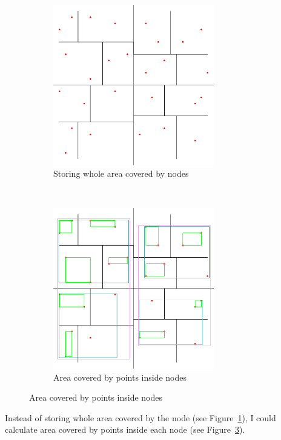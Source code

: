 \documentclass[10pt,a4paper]{article}
\begin{document}
\begin{figure}[h!]
        \centering
        \begin{subfigure}[b]{0.42\textwidth}
                \centering
                \includegraphics[width=7cm]{Figure1}
        	\caption{Storing whole area covered by nodes}
  				\label{fig:covered}
        \end{subfigure}%
        \qquad\qquad
        ~ %
        \begin{subfigure}[b]{0.42\textwidth}
                \centering
 				\includegraphics[width=7cm]{Figure2}
 				 \caption{Area covered by points inside nodes}
 				 \label{fig:inside}
        \end{subfigure}
        
\end{figure}

Instead of storing whole area covered by the node (see Figure~\ref{fig:covered}), I could calculate area covered by points inside each node (see Figure~\ref{fig:inside}).
\end{document}
